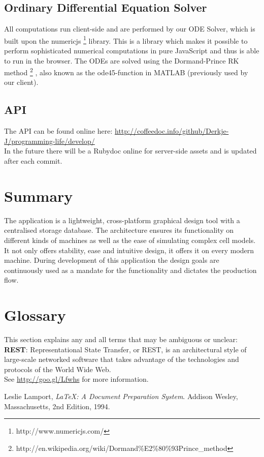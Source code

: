 \documentclass{report}
\begin{document}
		\subsection{Ordinary Differential Equation Solver}
			All computations run client-side and are performed by our ODE Solver, which is built upon the numericjs \footnote{http://www.numericjs.com/} library. This is a library which makes it possible to perform sophisticated numerical computations in pure JavaScript and thus is able to run in the browser. The ODEs are solved using the Dormand-Prince RK method \footnote{http://en.wikipedia.org/wiki/Dormand\%E2\%80\%93Prince\_method} , also known as the ode45-function in MATLAB (previously used by our client).
			
		\subsection{API}
			The API can be found online here: \url{http://coffeedoc.info/github/Derkje-J/programming-life/develop/} \\
			In the future there will be a Rubydoc online for server-side assets and is updated after each commit.
		\newpage
			
	\section{Summary}
		The application is a lightweight, cross-platform graphical design tool with a centralised storage database. The architecture ensures its functionality on different kinds of machines as well as the ease of simulating complex cell models. It not only offers stability, ease and intuitive design, it offers it on every modern machine. During development of this application the design goals are continuously used as a mandate for the functionality and dictates the production flow.
	\section{Glossary}
		This section explains any and all terms that may be ambiguous or unclear:\\
		
		\textbf{REST}: Representational State Transfer, or REST, is an architectural style of large-scale networked software that takes advantage of the technologies and protocols of the World Wide Web. \\
See \href{http://goo.gl/Lfwhs}{http://goo.gl/Lfwhs} for more information.



\listoffootnotes \clearpage

\begin{thebibliography}{9}

Leslie Lamport,
\emph{\LaTeX: A Document Preparation System}.
Addison Wesley, Massachusetts,
2nd Edition,
1994.

\end{thebibliography}
\end{document}
